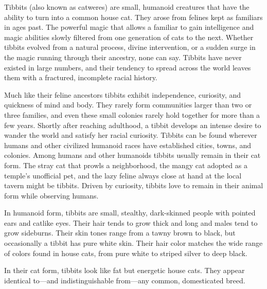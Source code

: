 
Tibbits (also known as catweres) are small, humanoid creatures that have the ability to turn into a common house cat. They arose from felines kept as familiars in ages past. The powerful magic that allows a familiar to gain intelligence and magic abilities slowly filtered from one generation of cats to the next. Whether tibbits evolved from a natural process, divine intervention, or a sudden surge in the magic running through their ancestry, none can say. Tibbits have never existed in large numbers, and their tendency to spread across the world leaves them with a fractured, incomplete racial history.

Much like their feline ancestors tibbits exhibit independence, curiosity, and quickness of mind and body. They rarely form communities larger than two or three families, and even these small colonies rarely hold together for more than a few years. Shortly after reaching adulthood, a tibbit develops an intense desire to wander the world and satisfy her racial curiosity. Tibbits can be found wherever humans and other civilized humanoid races have established cities, towns, and colonies. Among humans and other humanoids tibbits usually remain in their cat form. The stray cat that prowls a neighborhood, the mangy cat adopted as a temple's unofficial pet, and the lazy feline always close at hand at the local tavern might be tibbits. Driven by curiosity, tibbits love to remain in their animal form while observing humans.

In humanoid form, tibbits are small, stealthy, dark-skinned people with pointed ears and catlike eyes. Their hair tends to grow thick and long and males tend to grow sideburns. Their skin tones range from a tawny brown to black, but occasionally a tibbit has pure white skin. Their hair color matches the wide range of colors found in house cats, from pure white to striped silver to deep black.

In their cat form, tibbits look like fat but energetic house cats. They appear identical to—and indistinguishable from—any common, domesticated breed.

